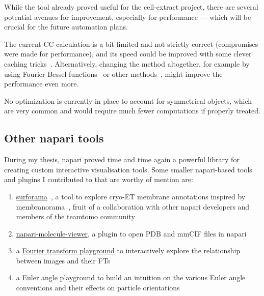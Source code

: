 While the tool already proved useful for the cell-extract project, there are several potential avenues for improvement, especially for performance --- which will be crucial for the future automation plans.

The current CC calculation is a bit limited and not strictly correct (compromises were made for performance), and its speed could be improved with some clever caching tricks~\cite{kasoComputationNormalizedCrosscorrelation2018}.
Alternatively, changing the method altogether, for example by using Fourier-Bessel functions~\cite{zhaoFourierBesselRotational2013} or other methods~\cite{almiraFastNormalizedCrosscorrelation2024}, might improve the performance even more.

No optimization is currently in place to account for symmetrical objects, which are very common and would require much fewer computations if properly treated.

\subsection{Other napari tools}

During my thesis, napari proved time and time again a powerful library for creating custom interactive visualisation tools.
Some smaller napari-based tools and plugins I contributed to that are worthy of mention are:

\begin{enumerate}
    \item \href{https://github.com/cellcanvas/surforama}{surforama}~\cite{yamauchiSurforamaInteractiveExploration2024}, a tool to explore cryo-ET membrane annotations inspired by membranorama~\cite{tegunovDtegunovMembranorama2024}, fruit of a collaboration with other napari developers and members of the teamtomo community
    \item \href{https://github.com/brisvag/napari-molecule-reader}{napari-molecule-viewer}, a plugin to open PDB and mmCIF files in napari
    \item a \href{https://github.com/napari/napari/blob/main/examples/fourier_transform_playground.py}{Fourier transform playground} to interactively explore the relationship between images and their FTs
    \item a \href{https://gist.github.com/brisvag/d6394d05b2f994e083ec279d6976484f}{Euler angle playground} to build an intuition on the various Euler angle conventions and their effects on particle orientations
\end{enumerate}

